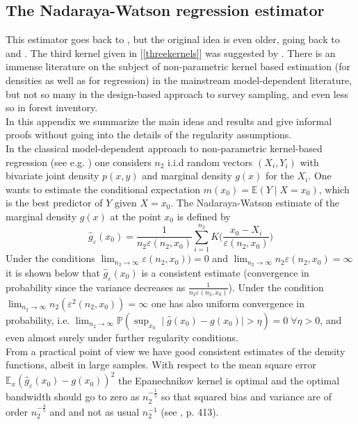 \documentclass[a4paper,12pt,leqno, titlepage]{article}
\newcommand{\EX}{\mathbb{E}}
\newcommand{\PR}{\mathbb{P}}
\begin{document}
\begin{appendix}
\section{The Nadaraya-Watson regression estimator}\label{appendixnadaraya}
This estimator goes back to \cite{nadaraya1}, but the original idea is even older, going back to \cite{rosenblatt} and \cite{parzen}. The third kernel given in [\ref{threekernels}] was suggested by \cite{epanechnikov}.
 There is an immense literature on the subject of non-parametric kernel based estimation (for densities as well as for regression) in the mainstream model-dependent literature, but not so many in the design-based approach to survey sampling, and even less so in forest inventory.\\
In this appendix we summarize the main ideas and results and give informal proofs without going into the details of the regularity assumptions.\\
In the classical model-dependent approach to non-parametric kernel-based regression (see e.g. \cite{nonparametricreg1})
one considers $n_2$ i.i.d random vectors $(X_i,Y_i)$ with bivariate joint density $p(x,y)$ and marginal density $g(x)$ for the $X_i$. One wants to estimate the conditional expectation $m(x_0)=\EX(Y \mid X=x_0)$, which is the best predictor of $Y$ given $X=x_0$. The Nadaraya-Watson estimate of the marginal density $g(x)$ at the point $x_0$ is defined by
\begin{equation}\label{nadarayamarginal}
\hat{g}_{\varepsilon}(x_0)=\frac{1}{n_2\varepsilon(n_2,x_0)}\sum^{n_2}_{i=1}K\big(\frac{x_0-X_i}{\varepsilon(n_2,x_0)}\big)
\end{equation}
Under the conditions $\lim_{n_2\to\infty}\varepsilon(n_2,x_0))=0$ and $\lim_{n_2\to\infty}n_2\varepsilon(n_2,x_0)=\infty$ it is shown below that $\hat{g}_{\varepsilon}(x_0)$ is a consistent estimate (convergence in probability since the variance decreases as $\frac{1}{n_2\varepsilon(n_2,x_0)}$).
 Under the  condition $\lim_{n_2\to\infty}n_2(\varepsilon^2(n_2,x_0))=\infty$ one has also uniform convergence in probability,  i.e. $\lim_{n_2\to\infty}\PR(\sup_{x_0}\mid \hat{g}(x_0)-g(x_0)\mid > \eta)=0\;\forall \eta>0$, and even almost surely under further regularity conditions.\\
From a practical point of view we have good consistent estimates of the density functions, albeit in large samples. With respect to the mean square error $\EX_x(\hat{g}_{\varepsilon}(x_0)-g(x_0))^2$ the Epanechnikov kernel is optimal and the optimal bandwidth should go to zero as $n_2^{-\frac{1}{5}}$ so that squared bias and variance are of order $n_2^{-\frac{4}{5}}$ and and not as usual $n_2^{-1}$ (see \cite{lehmann}, p. 413).\\

\end{appendix}
\end{document}
